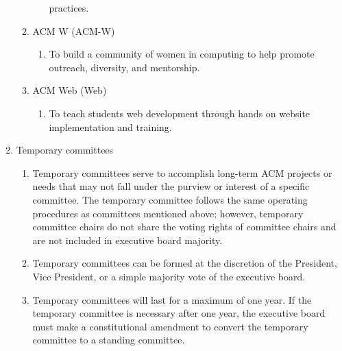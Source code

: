 \begin{enumerate}[label=\Alph*.]
\begin{enumerate}
\begin{enumerate}
            practices.
        \end{enumerate}
      \item ACM W (ACM-W)
        \begin{enumerate}
          \item To build a community of women in computing to help promote
            outreach, diversity, and mentorship.
        \end{enumerate}
      \item ACM Web (Web)
        \begin{enumerate}
          \item To teach students web development through hands on website
            implementation and training.
        \end{enumerate}
      \end{enumerate}
  \item Temporary committees
    \begin{enumerate}
      \item Temporary committees serve to accomplish long-term ACM projects or
        needs that may not fall under the purview or interest of a specific
        committee. The temporary committee follows the same operating procedures
        as committees mentioned above; however, temporary committee chairs do
        not share the voting rights of committee chairs and are not included in
        executive board majority.
      \item Temporary committees can be formed at the discretion of the
        President, Vice President, or a simple majority vote of the executive
        board.
      \item Temporary committees will last for a maximum of one year. If the
        temporary committee is necessary after one year, the executive board
        must make a constitutional amendment to convert the temporary committee
        to a standing committee.
    \end{enumerate}
\end{enumerate}

